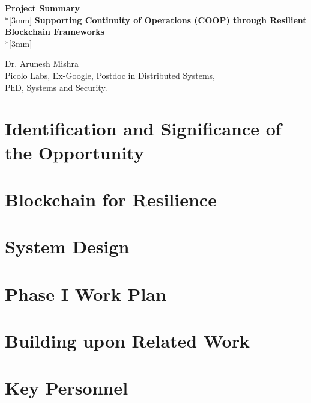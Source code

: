 \documentclass{proposal}
\begin{document}
\begin{center}
{{\bf Project Summary}}\\*[3mm]
{\Large \bf Supporting Continuity of Operations (COOP) through Resilient Blockchain Frameworks } \\*[3mm]

Dr. Arunesh Mishra\\
Picolo Labs, Ex-Google, Postdoc in Distributed Systems,\\ PhD, Systems and Security.

\end{center}
\section{Identification and Significance of the Opportunity}

\cite{sample_ref}

\section{Blockchain for Resilience}


\section{System Design}

\section{Phase I Work Plan}

\section{Building upon Related Work}


\section{Key Personnel}



\newpage
{}
\renewcommand{\thepage} {E--\arabic{page}}




%
\end{document}
